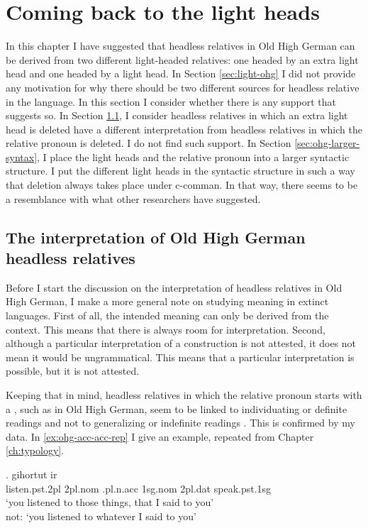 \section{Coming back to the light heads}\label{sec:coming-back}

In this chapter I have suggested that headless relatives in Old High German can be derived from two different light-headed relatives: one headed by an extra light head and one headed by a light head.
In Section \ref{sec:light-ohg} I did not provide any motivation for why there should be two different sources for headless relative in the language.
In this section I consider whether there is any support that suggests so.
In Section \ref{sec:interpretation-ohg}, I consider headless relatives in which an extra light head is deleted have a different interpretation from headless relatives in which the relative pronoun is deleted. I do not find such support.
In Section \ref{sec:ohg-larger-syntax}, I place the light heads and the relative pronoun into a larger syntactic structure. I put the different light heads in the syntactic structure in such a way that deletion always takes place under c-comman. In that way, there seems to be a resemblance with what other researchers have suggested.

\subsection{The interpretation of Old High German headless relatives}\label{sec:interpretation-ohg}

Before I start the discussion on the interpretation of headless relatives in Old High German, I make a more general note on studying meaning in extinct languages. First of all, the intended meaning can only be derived from the context. This means that there is always room for interpretation. Second, although a particular interpretation of a construction is not attested, it does not mean it would be ungrammatical. This means that a particular interpretation is possible, but it is not attested.

Keeping that in mind, headless relatives in which the relative pronoun starts with a , such as in Old High German, seem to be linked to individuating or definite readings and not to generalizing or indefinite readings \citep[cf.][]{fuss2017}. This is confirmed by my data. In \ref{ex:ohg-acc-acc-rep} I give an example, repeated from Chapter \ref{ch:typology}.

\exg. gihortut ir    \\
 listen.\ac{pst}.2\ac{pl}\scsub{[acc]} 2\ac{pl}.\ac{nom} .\ac{pl}.\ac{n}.\ac{acc} 1\ac{sg}.\ac{nom} 2\ac{pl}.\ac{dat} speak.\ac{pst}.1\ac{sg}\scsub{[acc]}\\
 `you listened to those things, that I said to you'\\
 not: `you listened to whatever I said to you' \label{ex:ohg-acc-acc-rep}

